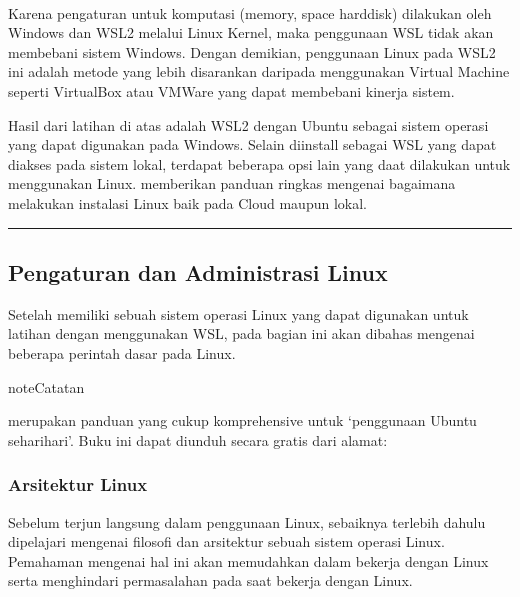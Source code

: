 \documentclass[letterpaper,10pt,english]{sphinxmanual}
\begin{document}
 

Karena pengaturan  untuk komputasi (memory, space harddisk) dilakukan  oleh Windows dan WSL2 melalui Linux Kernel, maka penggunaan WSL tidak akan membebani sistem Windows. Dengan demikian, penggunaan Linux pada WSL2 ini adalah metode yang lebih disarankan daripada menggunakan Virtual Machine seperti VirtualBox atau VMWare yang dapat membebani kinerja sistem.

Hasil dari latihan di atas adalah WSL2 dengan Ubuntu sebagai sistem operasi yang dapat digunakan pada Windows. Selain diinstall sebagai WSL yang dapat diakses pada sistem lokal, terdapat beberapa opsi lain yang daat dilakukan untuk menggunakan Linux.  memberikan panduan ringkas mengenai bagaimana melakukan instalasi Linux baik pada Cloud maupun lokal.


\bigskip\hrule\bigskip



\subsection{Pengaturan dan Administrasi Linux}
\label{\detokenize{sesi1/arsitektur:pengaturan-dan-administrasi-linux}}\label{\detokenize{sesi1/arsitektur::doc}}
Setelah memiliki sebuah sistem operasi Linux yang dapat digunakan untuk latihan dengan menggunakan WSL, pada bagian ini akan dibahas mengenai beberapa perintah dasar pada Linux.

\begin{sphinxadmonition}{note}{Catatan}

 merupakan panduan yang cukup komprehensive untuk ‘penggunaan Ubuntu sehari\sphinxhyphen{}hari’. Buku ini dapat diunduh secara gratis dari alamat: 
\end{sphinxadmonition}


\subsubsection{Arsitektur Linux}
\label{\detokenize{sesi1/arsitektur:arsitektur-linux}}
Sebelum terjun langsung dalam penggunaan Linux, sebaiknya terlebih dahulu dipelajari mengenai filosofi dan arsitektur sebuah sistem operasi Linux. Pemahaman mengenai hal ini akan memudahkan dalam bekerja dengan Linux serta menghindari permasalahan pada saat bekerja dengan Linux.
\end{document}
